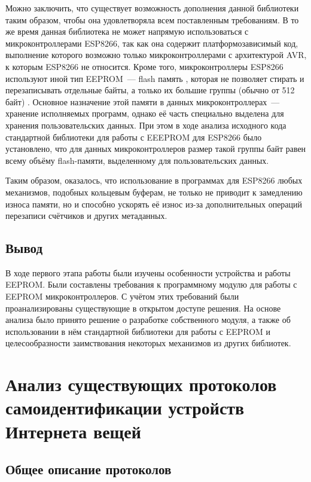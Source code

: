 Можно заключить, что существует возможность дополнения данной библиотеки таким образом, чтобы она удовлетворяла всем поставленным требованиям.
В то же время данная библиотека не может напрямую использоваться с микроконтроллерами ESP8266, так как она содержит платформозависимый код, выполнение которого возможно только микроконтроллерами с архитектурой AVR, к которым ESP8266 не относится.
Кроме того, микроконтроллеры ESP8266 используют иной тип EEPROM~--- flash память \cite{web:esp-eeprom-src, web:usage-of-esp-eeprom}, которая не позволяет стирать и перезаписывать отдельные байты, а только их большие группы (обычно от 512 байт) \cite{incollection:flash-memory}.
Основное назначение этой памяти в данных микроконтроллерах~--- хранение исполняемых программ, однако её часть специально выделена для хранения пользовательских данных.
При этом в ходе анализа исходного кода стандартной библиотеки \cite{web:esp-eeprom-src} для работы с EEEPROM для ESP8266 было установлено, что для данных микроконтроллеров размер такой группы байт равен всему объёму flash-памяти, выделенному для пользовательских данных.

Таким образом, оказалось, что использование в программах для ESP8266 любых механизмов, подобных кольцевым буферам, не только не приводит к замедлению износа памяти, но и способно ускорять её износ из-за дополнительных операций перезаписи счётчиков и других метаданных.

\subsection{Вывод}

В ходе первого этапа работы были изучены особенности устройства и работы EEPROM.
Были составлены требования к программному модулю для работы с EEPROM микроконтроллеров.
С учётом этих требований были проанализированы существующие в открытом доступе решения.
На основе анализа было принято решение о разработке собственного модуля, а также об использовании в нём стандартной библиотеки для работы с EEPROM и целесообразности заимствования некоторых механизмов из других библиотек.


\section{Анализ существующих протоколов самоидентификации устройств Интернета вещей}

\subsection{Общее описание протоколов}

